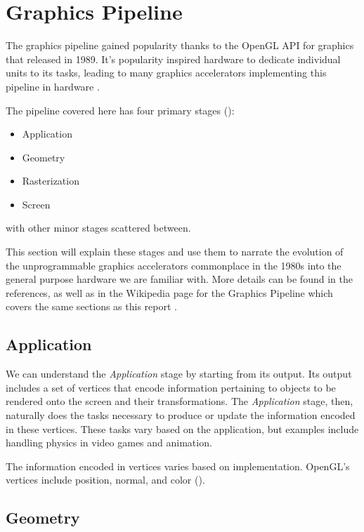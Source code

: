 \chapter{Graphics Pipeline}

The graphics pipeline gained popularity thanks to the OpenGL API for graphics
that released in 1989. It's popularity inspired hardware to dedicate individual units
to its tasks, leading to many graphics accelerators implementing this pipeline in hardware
\cite{mcclanahan2010history}.

The pipeline covered here has four primary stages (\cite{crow2004evolution}):

\begin{itemize}
    \item Application
    \item Geometry
    \item Rasterization
    \item Screen
\end{itemize}

with other minor stages scattered between.

This section will explain these stages and use them to narrate the evolution of the unprogrammable graphics accelerators commonplace in the 1980s into the general purpose hardware we are familiar with.
More details can be found in the references, as well as in the Wikipedia page for
the Graphics Pipeline which covers the same sections as this report \cite{wiki:Graphics_pipeline}.

\section{Application}

We can understand the \textit{Application} stage by starting from its output.
Its output includes a set of vertices that encode information pertaining to objects to be rendered onto the screen and their transformations.
The \textit{Application} stage, then, naturally does the tasks necessary to produce or update the information encoded in these vertices.
These tasks vary based on the application, but examples include handling physics in video games and animation.

The information encoded in vertices varies based on implementation. OpenGL's vertices include position, normal, and color (\cite{wiki:vertex}).

\section{Geometry}

